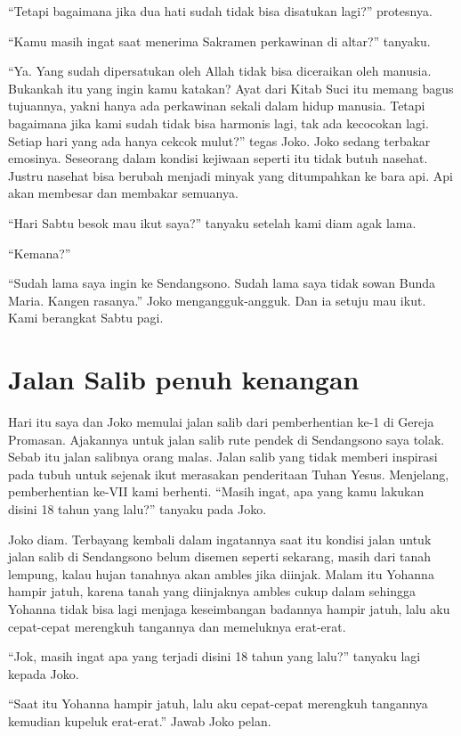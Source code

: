 ``Tetapi bagaimana jika dua hati sudah tidak bisa disatukan lagi?'' protesnya.

``Kamu masih ingat saat menerima Sakramen perkawinan di altar?'' tanyaku.

``Ya. Yang sudah dipersatukan oleh Allah tidak bisa diceraikan oleh manusia. Bukankah itu yang ingin kamu katakan? Ayat dari Kitab Suci itu memang bagus tujuannya, yakni hanya ada perkawinan sekali dalam hidup manusia. Tetapi bagaimana jika kami sudah tidak bisa harmonis lagi, tak ada kecocokan lagi. Setiap hari yang ada hanya cekcok mulut?'' tegas Joko.
Joko sedang terbakar emosinya. Seseorang dalam kondisi kejiwaan seperti itu tidak butuh nasehat. Justru nasehat bisa berubah menjadi minyak yang ditumpahkan ke bara api. Api akan membesar dan membakar semuanya.

``Hari Sabtu besok mau ikut saya?'' tanyaku setelah kami diam agak lama.

``Kemana?''

``Sudah lama saya ingin ke Sendangsono. Sudah lama saya tidak sowan Bunda Maria. Kangen rasanya.''
Joko mengangguk-angguk. Dan ia setuju mau ikut. Kami berangkat Sabtu pagi.

\section*{Jalan Salib penuh kenangan}

Hari itu saya dan Joko memulai jalan salib dari pemberhentian ke-1 di Gereja Promasan. Ajakannya untuk jalan salib rute pendek di Sendangsono saya tolak. Sebab itu jalan salibnya orang malas. Jalan salib yang tidak memberi inspirasi pada tubuh untuk sejenak ikut merasakan penderitaan Tuhan Yesus.
Menjelang, pemberhentian ke-VII kami berhenti. ``Masih ingat, apa yang kamu lakukan disini 18 tahun yang lalu?'' tanyaku pada Joko.

Joko diam. Terbayang kembali dalam ingatannya saat itu kondisi jalan untuk jalan salib di Sendangsono belum disemen seperti sekarang, masih dari tanah lempung, kalau hujan tanahnya akan ambles jika diinjak.  Malam itu Yohanna hampir jatuh, karena tanah yang diinjaknya ambles cukup dalam sehingga Yohanna tidak bisa lagi menjaga keseimbangan badannya hampir jatuh, lalu aku cepat-cepat merengkuh tangannya dan memeluknya erat-erat.

``Jok, masih ingat apa yang terjadi disini 18 tahun yang lalu?'' tanyaku lagi kepada Joko.

``Saat itu Yohanna hampir jatuh, lalu aku cepat-cepat merengkuh tangannya kemudian kupeluk erat-erat.'' Jawab Joko pelan.

